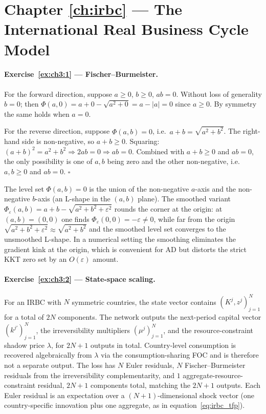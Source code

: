 \documentclass[11pt,a4paper]{report}
\begin{document}
\section{Chapter \ref{ch:irbc} --- The International Real Business Cycle Model}
\label{sol:ch3}

\paragraph{Exercise~\ref{ex:ch3:1} --- Fischer--Burmeister.}
For the forward direction, suppose $a \ge 0$, $b \ge 0$, $ab = 0$.  Without loss of generality $b = 0$; then $\Phi(a, 0) = a + 0 - \sqrt{a^2 + 0} = a - |a| = 0$ since $a \ge 0$.  By symmetry the same holds when $a = 0$.

For the reverse direction, suppose $\Phi(a,b) = 0$, i.e.\ $a + b = \sqrt{a^2 + b^2}$.  The right-hand side is non-negative, so $a + b \ge 0$.  Squaring: $(a+b)^2 = a^2 + b^2 \Rightarrow 2ab = 0 \Rightarrow ab = 0$.  Combined with $a + b \ge 0$ and $ab = 0$, the only possibility is one of $a, b$ being zero and the other non-negative, i.e.\ $a, b \ge 0$ and $ab = 0$.  $\square$

The level set $\Phi(a, b) = 0$ is the union of the non-negative $a$-axis and the non-negative $b$-axis (an L-shape in the $(a,b)$ plane).  The smoothed variant $\Phi_\varepsilon(a,b) = a + b - \sqrt{a^2 + b^2 + \varepsilon^2}$ rounds the corner at the origin: at $(a,b) = (0,0)$ one finds $\Phi_\varepsilon(0,0) = -\varepsilon \neq 0$, while far from the origin $\sqrt{a^2 + b^2 + \varepsilon^2} \approx \sqrt{a^2 + b^2}$ and the smoothed level set converges to the unsmoothed L-shape.  In a numerical setting the smoothing eliminates the gradient kink at the origin, which is convenient for AD but distorts the strict KKT zero set by an $O(\varepsilon)$ amount.

\paragraph{Exercise~\ref{ex:ch3:2} --- State-space scaling.}
For an IRBC with $N$ symmetric countries, the state vector contains $(K^j, z^j)_{j=1}^N$ for a total of $2N$ components.  The network outputs the next-period capital vector $(k^{j\prime})_{j=1}^N$, the irreversibility multipliers $(\mu^j)_{j=1}^N$, and the resource-constraint shadow price $\lambda$, for $2N + 1$ outputs in total.  Country-level consumption is recovered algebraically from $\lambda$ via the consumption-sharing FOC and is therefore not a separate output.  The loss has $N$ Euler residuals, $N$ Fischer--Burmeister residuals from the irreversibility complementarity, and $1$ aggregate-resource-constraint residual, $2N + 1$ components total, matching the $2N + 1$ outputs.  Each Euler residual is an expectation over a $(N+1)$-dimensional shock vector (one country-specific innovation plus one aggregate, as in equation~\eqref{eq:irbc_tfp}).
\end{document}
